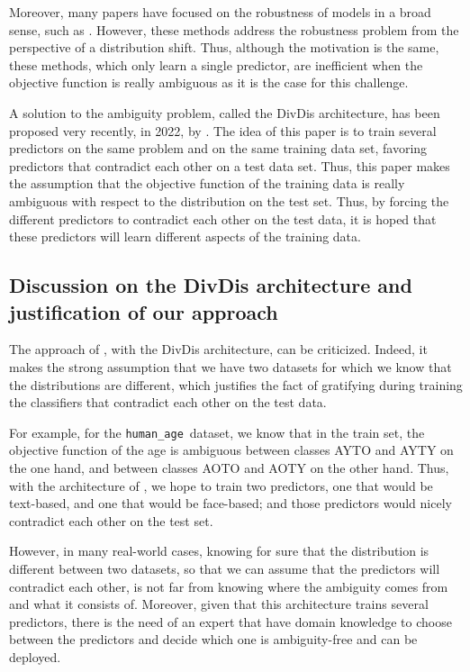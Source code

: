 \documentclass[sigconf, nonacm]{acmart}
\newcommand{\humanAge}{\texttt{human\_age}\ }
\begin{document}
Moreover, many papers have focused on the robustness of models in a broad sense, such as \cite{tzeng_deep_2014, ganin_domain-adversarial_2016, arjovsky_invariant_2020, sagawa_distributionally_2020, nam_learning_2020, liu_just_2021}. However, these methods address the robustness problem from the perspective of a distribution shift. Thus, although the motivation is the same, these methods, which only learn a single predictor, are inefficient when the objective function is really ambiguous as it is the case for this challenge.

A solution to the ambiguity problem, called the DivDis architecture, has been proposed very recently, in 2022, by \cite{lee_diversify_2022}. The idea of this paper is to train several predictors on the same problem and on the same training data set, favoring predictors that contradict each other on a test data set. Thus, this paper makes the assumption that the objective function of the training data is really ambiguous with respect to the distribution on the test set. Thus, by forcing the different predictors to contradict each other on the test data, it is hoped that these predictors will learn different aspects of the training data. 

\subsection{Discussion on the DivDis architecture and justification of our approach}
\label{sec:justification_approach}

The approach  of \cite{lee_diversify_2022}, with the DivDis architecture, can be criticized. Indeed, it makes the strong assumption that we have two datasets for which we know that the distributions are different, which justifies the fact of gratifying during training the classifiers that contradict each other on the test data.

For example, for the \humanAge dataset, we know that in the train set, the objective function of the age is ambiguous between classes AYTO and AYTY on the one hand, and between classes AOTO and AOTY on the other hand. Thus, with the architecture of \cite{lee_diversify_2022}, we hope to train two predictors, one that would be text-based, and one that would be face-based; and those predictors would nicely contradict each other on the test set. 

However, in many real-world cases, knowing for sure that the distribution is different between two datasets, so that we can assume that the predictors will contradict each other, is not far from knowing where the ambiguity comes from and what it consists of. Moreover, given that this architecture trains several predictors, there is the need of an expert that have domain knowledge to choose between the predictors and decide which one is ambiguity-free and can be deployed. 
\end{document}
